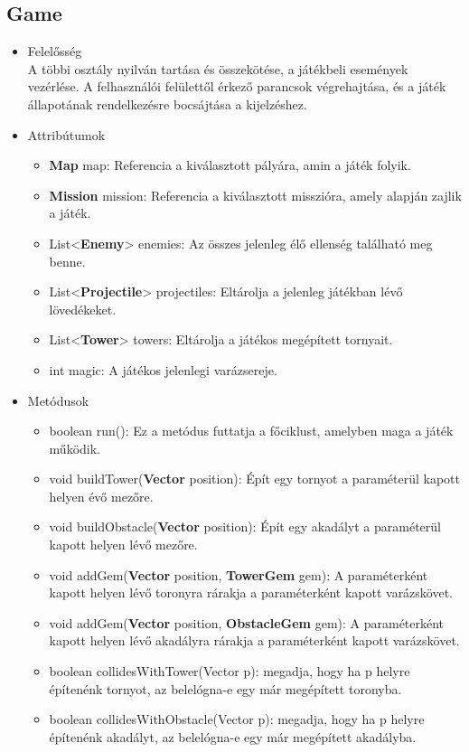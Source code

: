 \subsection{Game}
\begin{itemize}
\item Felelősség\\
A többi osztály nyilván tartása és összekötése, a játékbeli események vezérlése. A felhasználói felülettől érkező parancsok végrehajtása, és a játék állapotának rendelkezésre bocsájtása a kijelzéshez.
\item Attribútumok
	\begin{itemize}
		\item \textbf{Map} map: Referencia a kiválasztott pályára, amin a játék folyik.
		\item \textbf{Mission} mission: Referencia a kiválasztott misszióra, amely alapján zajlik a játék.
		\item List<\textbf{Enemy}> enemies: Az összes jelenleg élő ellenség található meg benne.
		\item List<\textbf{Projectile}> projectiles: Eltárolja a jelenleg játékban lévő lövedékeket.
		\item List<\textbf{Tower}> towers: Eltárolja a játékos megépített tornyait.
		\item int magic: A játékos jelenlegi varázsereje.
	\end{itemize}
\item Metódusok
	\begin{itemize}
		\item boolean run(): Ez a metódus futtatja a főciklust, amelyben maga a játék működik.
		\item void buildTower(\textbf{Vector} position): Épít egy tornyot a paraméterül kapott helyen évő mezőre.
		\item void buildObstacle(\textbf{Vector} position): Épít egy akadályt a paraméterül kapott helyen lévő mezőre.
		\item void addGem(\textbf{Vector} position, \textbf{TowerGem} gem): A paraméterként kapott helyen lévő toronyra rárakja a paraméterként kapott varázskövet.
		\item void addGem(\textbf{Vector} position, \textbf{ObstacleGem} gem): A paraméterként kapott helyen lévő akadályra rárakja a paraméterként kapott varázskövet.
		\item boolean collidesWithTower(Vector p): megadja, hogy ha p helyre építenénk tornyot, az belelógna-e egy már megépített toronyba.
		\item boolean collidesWithObstacle(Vector p): megadja, hogy ha p helyre építenénk akadályt, az belelógna-e egy már megépített akadályba.
	\end{itemize}
\end{itemize}




